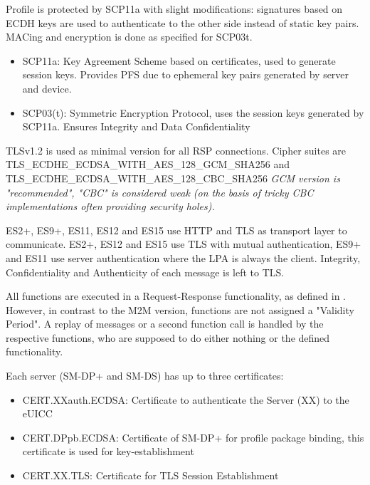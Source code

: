 Profile is protected by SCP11a \parencite{GPC:AmendF} with slight modifications: signatures based on ECDH keys are used to authenticate to the other side instead of static key pairs. MACing and encryption is done as specified for SCP03t.

\begin{itemize}
    \item SCP11a: Key Agreement Scheme based on certificates, used to generate session keys. Provides PFS due to ephemeral key pairs generated by server and device.
    \item SCP03(t): Symmetric Encryption Protocol, uses the session keys generated by SCP11a. Ensures Integrity and Data Confidentiality
\end{itemize}

TLSv1.2 is used as minimal version for all RSP connections. Cipher suites are TLS\_ECDHE\_ECDSA\_WITH\_AES\_128\_GCM\_SHA256 and TLS\_ECDHE\_ECDSA\_WITH\_AES\_128\_CBC\_SHA256 \textit{GCM version is "recommended", "CBC" is considered weak (on the basis of tricky CBC implementations often providing security holes).}

ES2+, ES9+, ES11, ES12 and ES15 use HTTP and TLS as transport layer to communicate. ES2+, ES12 and ES15 use TLS with mutual authentication, ES9+ and ES11 use server authentication where the LPA is always the client. Integrity, Confidentiality and Authenticity of each message is left to TLS. 

All functions are executed in a Request-Response functionality, as defined in \parencite{SGP:02}. However, in contrast to the M2M version, functions are not assigned a "Validity Period". A replay of messages or a second function call is handled by the respective functions, who are supposed to do either nothing or the defined functionality.

Each server (SM-DP+ and SM-DS) has up to three certificates: 
\begin{itemize}
    \item CERT.XXauth.ECDSA: Certificate to authenticate the Server (XX) to the eUICC
    \item CERT.DPpb.ECDSA: Certificate of SM-DP+ for profile package binding, this certificate is used for key-establishment 
    \item CERT.XX.TLS: Certificate for TLS Session Establishment
\end{itemize}

